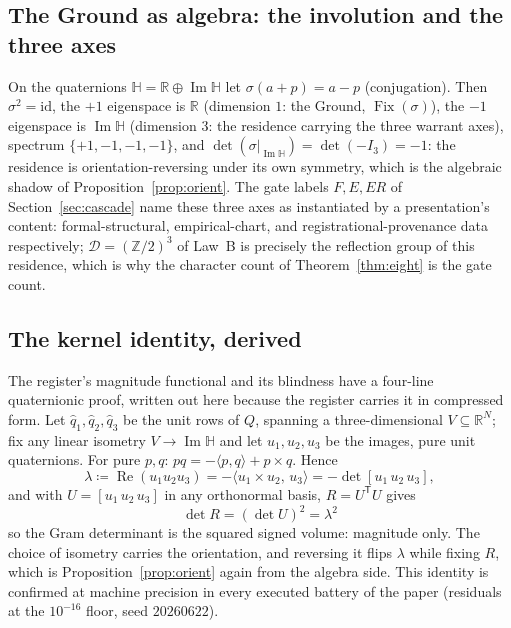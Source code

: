 \documentclass[twocolumn,10pt]{article}
\theoremstyle{plain}
\theoremstyle{definition}
\newcommand{\Rl}{\mathbb{R}}
\newcommand{\Hq}{\mathbb{H}}
\begin{document}
\subsection{The Ground as algebra: the involution and the three axes}
On the quaternions $\Hq=\Rl\oplus\operatorname{Im}\Hq$ let $\sigma(a+p)=a-p$ (conjugation). Then $\sigma^2=\mathrm{id}$, the $+1$ eigenspace is $\Rl$ (dimension $1$: the Ground, $\operatorname{Fix}(\sigma)$), the $-1$ eigenspace is $\operatorname{Im}\Hq$ (dimension $3$: the residence carrying the three warrant axes), spectrum $\{+1,-1,-1,-1\}$, and $\det(\sigma|_{\operatorname{Im}\Hq})=\det(-I_3)=-1$: the residence is orientation-reversing under its own symmetry, which is the algebraic shadow of Proposition~\ref{prop:orient}. The gate labels $F,E,ER$ of Section~\ref{sec:cascade} name these three axes as instantiated by a presentation's content: formal-structural, empirical-chart, and registrational-provenance data respectively; $\mathcal D=(\mathbb Z/2)^3$ of Law~B is precisely the reflection group of this residence, which is why the character count of Theorem~\ref{thm:eight} is the gate count.

\subsection{The kernel identity, derived}
The register's magnitude functional and its blindness have a four-line quaternionic proof, written out here because the register carries it in compressed form. Let $\hat q_1,\hat q_2,\hat q_3$ be the unit rows of $Q$, spanning a three-dimensional $V\subseteq\Rl^N$; fix any linear isometry $V\to\operatorname{Im}\Hq$ and let $u_1,u_2,u_3$ be the images, pure unit quaternions. For pure $p,q$: $pq=-\langle p,q\rangle+p\times q$. Hence
\[
\lambda\coloneqq\operatorname{Re}(u_1u_2u_3)=-\langle u_1\times u_2,\,u_3\rangle=-\det[u_1\,u_2\,u_3],
\]
and with $U=[u_1\,u_2\,u_3]$ in any orthonormal basis, $R=U^{\mathsf T}U$ gives
\[
\boxed{\;\det R=(\det U)^2=\lambda^2\;}
\]
so the Gram determinant is the squared signed volume: magnitude only. The choice of isometry carries the orientation, and reversing it flips $\lambda$ while fixing $R$, which is Proposition~\ref{prop:orient} again from the algebra side. This identity is confirmed at machine precision in every executed battery of the paper (residuals at the $10^{-16}$ floor, seed $20260622$).
\end{document}
